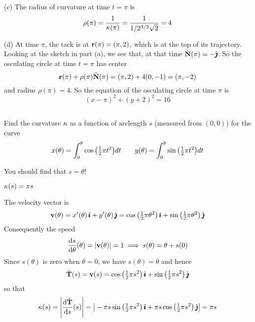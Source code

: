 \begin{solution}
(c) The radius of curvature at time $t=\pi$ is
\begin{equation*}
\rho(\pi) = \frac{1}{\kappa(\pi)}
          = \frac{1}{1/2^{3/2}\sqrt{2}}
          =4
\end{equation*}

(d) At time $\pi$, the tack is at $\mathbf{r}(\pi)=(\pi,2)$, which is at the top 
of its trajectory. Looking at the sketch in part (a), we see that,
at that time $\hat{\mathbf{N}}(\pi) = -\hat{\pmb{\jmath}}$.
So the osculating circle at time $t=\pi$ has center
\begin{equation*}
\mathbf{r}(\pi) + \rho(\pi) \hat{\mathbf{N}}(\pi)
=(\pi,2) + 4(0,-1)
=(\pi,-2)
\end{equation*}
and radius $\rho(\pi)=4$. So the equation  of the osculating circle
at time $\pi$ is
\begin{equation*}
(x-\pi)^2 +(y+2)^2 = 16
\end{equation*}
\end{solution}





\subsection*{\Application}

\begin{question}
 Find the curvature $\kappa$ as a function of arclength $s$ 
(measured from $(0,0)$) for the curve
\begin{equation*}
x(\theta)=\int_0^\theta \cos\big(\tfrac{1}{2}\pi t^2\big)dt\quad \quad
y(\theta)=\int_0^\theta \sin\big(\tfrac{1}{2}\pi t^2\big)dt
\end{equation*}
\end{question}

\begin{hint} 
You should find that $s=\theta$!
\end{hint}

\begin{answer} 
$\kappa(s)=\pi s$
\end{answer}

\begin{solution} 
The velocity vector is
\begin{equation*}
\mathbf{v}(\theta)=x'(\theta)\,\hat{\pmb{\imath}}+y'(\theta)\,\hat{\pmb{\jmath}}
= \cos\big(\tfrac{1}{2}\pi\theta^2\big)\,\hat{\pmb{\imath}} + \sin\big(\tfrac{1}{2}\pi\theta^2\big)\,\hat{\pmb{\jmath}}
\end{equation*}
Consequently the speed
\begin{equation*}
\diff{s}{\theta}(\theta)= |\vv(\theta)|=1
\implies s(\theta)=\theta+s(0)
\end{equation*}
Since $s(\theta)$ is zero when $\theta=0$, we have $s(\theta)=\theta$ and hence
\begin{equation*}
\hat{\mathbf{T}}(s)=\mathbf{v}(s)
= \cos\big(\tfrac{1}{2}\pi s^2\big)\,\hat{\pmb{\imath}} + \sin\big(\tfrac{1}{2}\pi s^2\big)\,\hat{\pmb{\jmath}}
\end{equation*}
so that
\begin{equation*}
\ka(s)=\left|\diff{\hT}{s}(s)\right|
=\big|-\pi s\sin\big(\half\pi s^2\big)\,\hi
+\pi s \cos\big(\half\pi s^2\big)\,\hj\big|
=\pi s
\end{equation*}
\end{solution}


